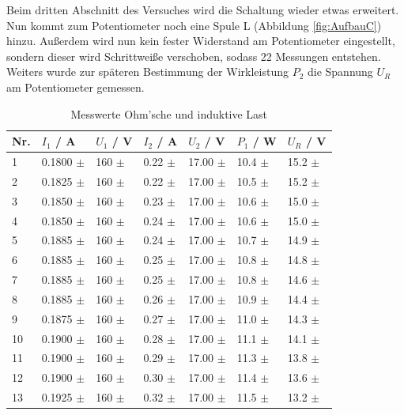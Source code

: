 \documentclass[12pt,a4paper,twoside]{article}
\begin{document}
Beim dritten Abschnitt des Versuches wird die Schaltung wieder etwas erweitert. Nun kommt zum Potentiometer noch eine Spule L (Abbildung \ref{fig:AufbauC}) hinzu.
Außerdem wird nun kein fester Widerstand am Potentiometer eingestellt, sondern dieser wird Schrittweiße verschoben, sodass 22 Messungen entstehen. Weiters wurde zur späteren Bestimmung der Wirkleistung $P_{2}$ die Spannung $U_{R}$ am Potentiometer gemessen.

\begin{table}[H]
    \centering
    \caption{Messwerte Ohm'sche und induktive Last}
    \label{tab:messwerteOhmInduktiv}
    \begin{tabular}{| l | l | l | l | l | l | l |}
        \hline
        Nr. & $I_{1}$ / A  & $U_{1}$ / V & $I_{2}$ / A & $U_{2}$ / V & $P_{1}$ / W & $U_{R}$ / V \\
        \hline
        1 & 0.1800 $\pm$  & 160 $\pm$  & 0.22 $\pm$  & 17.00 $\pm$  & 10.4 $\pm$ & 15.2 $\pm$  \\
        2 & 0.1825 $\pm$  & 160 $\pm$  & 0.22 $\pm$  & 17.00 $\pm$  & 10.5 $\pm$ & 15.2 $\pm$  \\
        3 & 0.1850 $\pm$  & 160 $\pm$  & 0.23 $\pm$  & 17.00 $\pm$  & 10.6 $\pm$ & 15.0 $\pm$  \\
        4 & 0.1850 $\pm$  & 160 $\pm$  & 0.24 $\pm$  & 17.00 $\pm$  & 10.6 $\pm$ & 15.0 $\pm$  \\
        5 & 0.1885 $\pm$  & 160 $\pm$  & 0.24 $\pm$  & 17.00 $\pm$  & 10.7 $\pm$ & 14.9 $\pm$  \\
        6 & 0.1885 $\pm$  & 160 $\pm$  & 0.25 $\pm$  & 17.00 $\pm$  & 10.8 $\pm$ & 14.8 $\pm$  \\
        7 & 0.1885 $\pm$  & 160 $\pm$  & 0.25 $\pm$  & 17.00 $\pm$  & 10.8 $\pm$ & 14.6 $\pm$  \\
        8 & 0.1885 $\pm$  & 160 $\pm$  & 0.26 $\pm$  & 17.00 $\pm$  & 10.9 $\pm$ & 14.4 $\pm$  \\
        9 & 0.1875 $\pm$  & 160 $\pm$  & 0.27 $\pm$  & 17.00 $\pm$  & 11.0 $\pm$ & 14.3 $\pm$  \\
        10 & 0.1900 $\pm$  & 160 $\pm$  & 0.28 $\pm$  & 17.00 $\pm$  & 11.1 $\pm$ & 14.1 $\pm$  \\
        11 & 0.1900 $\pm$  & 160 $\pm$  & 0.29 $\pm$  & 17.00 $\pm$  & 11.3 $\pm$ & 13.8 $\pm$  \\
        12 & 0.1900 $\pm$  & 160 $\pm$  & 0.30 $\pm$  & 17.00 $\pm$  & 11.4 $\pm$ & 13.6 $\pm$  \\
        13 & 0.1925 $\pm$  & 160 $\pm$  & 0.32 $\pm$  & 17.00 $\pm$  & 11.5 $\pm$ & 13.2 $\pm$  \\

\end{tabular}
\end{table}
\end{document}
